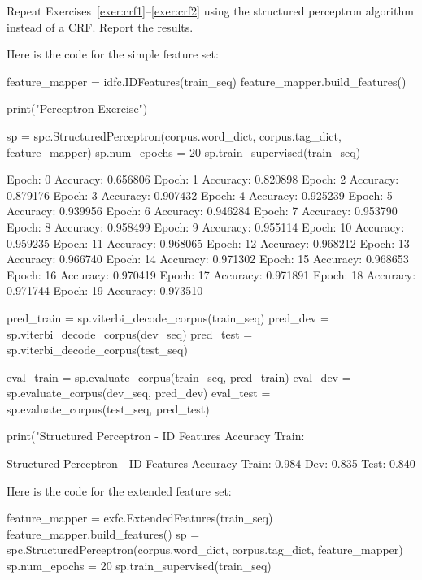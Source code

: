 \begin{exercise}
Repeat Exercises~\ref{exer:crf1}--\ref{exer:crf2} using the structured perceptron algorithm 
instead of a CRF. Report the results. 

Here is the code for the simple feature set:


\begin{python}
feature_mapper = idfc.IDFeatures(train_seq)
feature_mapper.build_features()

print("Perceptron Exercise")

sp = spc.StructuredPerceptron(corpus.word_dict, corpus.tag_dict, feature_mapper)
sp.num_epochs = 20
sp.train_supervised(train_seq)

Epoch: 0 Accuracy: 0.656806
Epoch: 1 Accuracy: 0.820898
Epoch: 2 Accuracy: 0.879176
Epoch: 3 Accuracy: 0.907432
Epoch: 4 Accuracy: 0.925239
Epoch: 5 Accuracy: 0.939956
Epoch: 6 Accuracy: 0.946284
Epoch: 7 Accuracy: 0.953790
Epoch: 8 Accuracy: 0.958499
Epoch: 9 Accuracy: 0.955114
Epoch: 10 Accuracy: 0.959235
Epoch: 11 Accuracy: 0.968065
Epoch: 12 Accuracy: 0.968212
Epoch: 13 Accuracy: 0.966740
Epoch: 14 Accuracy: 0.971302
Epoch: 15 Accuracy: 0.968653
Epoch: 16 Accuracy: 0.970419
Epoch: 17 Accuracy: 0.971891
Epoch: 18 Accuracy: 0.971744
Epoch: 19 Accuracy: 0.973510

pred_train = sp.viterbi_decode_corpus(train_seq)
pred_dev = sp.viterbi_decode_corpus(dev_seq)
pred_test = sp.viterbi_decode_corpus(test_seq)



eval_train = sp.evaluate_corpus(train_seq, pred_train)
eval_dev = sp.evaluate_corpus(dev_seq, pred_dev)
eval_test = sp.evaluate_corpus(test_seq, pred_test)

print("Structured Perceptron - ID Features Accuracy Train: %
\end{python}


\begin{python}
Structured Perceptron - ID Features Accuracy Train: 0.984 Dev: 0.835 Test: 0.840
\end{python}

Here is the code for the extended feature set:

\begin{python}
feature_mapper = exfc.ExtendedFeatures(train_seq)
feature_mapper.build_features()
sp = spc.StructuredPerceptron(corpus.word_dict, corpus.tag_dict, feature_mapper)
sp.num_epochs = 20
sp.train_supervised(train_seq)


\end{python}
\end{exercise}
